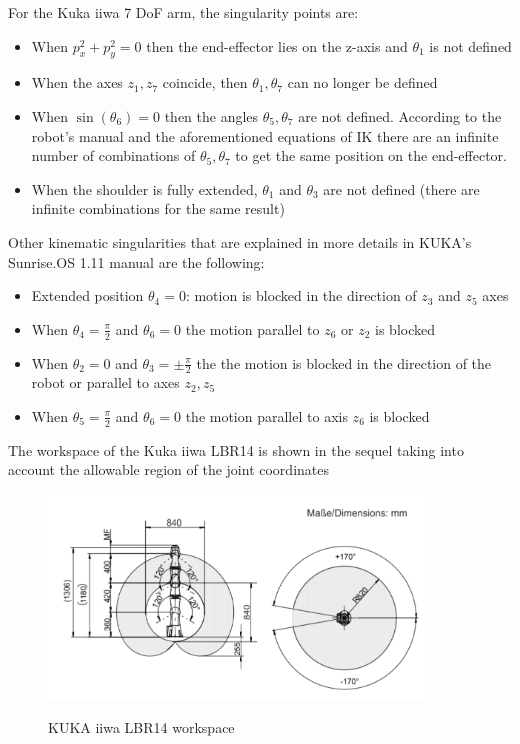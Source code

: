 For the Kuka iiwa 7 DoF arm, the singularity points are:
\begin{itemize}
	\item When $p_x^2 + p_y^2 = 0$ then the end-effector lies on the z-axis and $θ_1$ is not defined
	\item When the axes $z_1,z_7$ coincide, then $θ_1,θ_7$ can no longer be defined
	\item When $\sin\left( θ_6 \right) = 0$ then the angles $θ_5, θ_7$ are not defined. According to the robot's manual and the aforementioned equations of IK there are an infinite number of combinations of
	$θ_5, θ_7$ to get the same position on the end-effector.
	\item When the shoulder is fully extended, $θ_1$ and $θ_3$ are not defined (there are infinite combinations for the same result)
\end{itemize}
Other kinematic singularities that are explained in more details in KUKA's Sunrise.OS 1.11 manual are the following:
\begin{itemize}
	\item Extended position $θ_4 = 0$: motion is blocked in the direction of $z_3$ and $z_5$ axes
	\item When $θ_4 = \frac{π}{2}$ and $θ_6 = 0$ the motion parallel to $z_6$ or $z_2$ is blocked
	\item When $θ_2 = 0$ and $θ_3 = \pm \frac{π}{2}$ the the motion is blocked in the direction of the robot or parallel to axes $z_2,z_5$
	\item When $θ_5 = \frac{π}{2}$ and $θ_6 = 0$ the motion parallel to axis $z_6$ is blocked
\end{itemize}
The workspace of the Kuka iiwa LBR14 is shown in the sequel taking into account the allowable region of the joint coordinates

\begin{figure}[htbp]
\centering
\includegraphics[width=10cm]{images/iiwa-workspace.png}\\
\caption{KUKA iiwa LBR14 workspace}
\end{figure}

